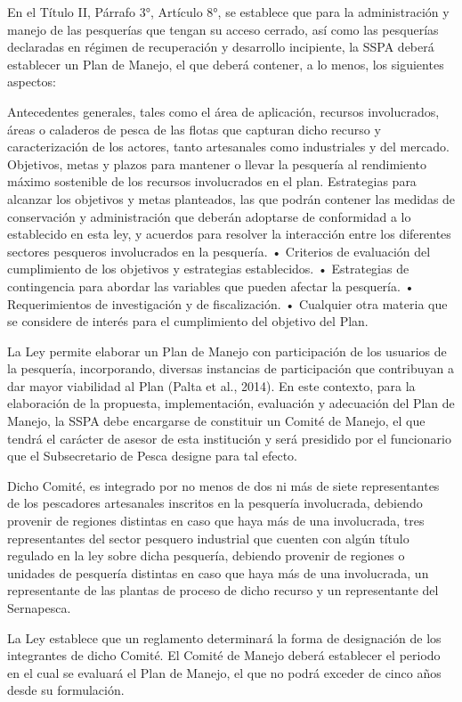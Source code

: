 \documentclass[
]{article}
\begin{document}
En el Título II, Párrafo 3°, Artículo 8°, se establece que para la
administración y manejo de las pesquerías que tengan su acceso cerrado,
así como las pesquerías declaradas en régimen de recuperación y
desarrollo incipiente, la SSPA deberá establecer un Plan de Manejo, el
que deberá contener, a lo menos, los siguientes aspectos:

Antecedentes generales, tales como el área de aplicación, recursos
involucrados, áreas o caladeros de pesca de las flotas que capturan
dicho recurso y caracterización de los actores, tanto artesanales como
industriales y del mercado. Objetivos, metas y plazos para mantener o
llevar la pesquería al rendimiento máximo sostenible de los recursos
involucrados en el plan. Estrategias para alcanzar los objetivos y metas
planteados, las que podrán contener las medidas de conservación y
administración que deberán adoptarse de conformidad a lo establecido en
esta ley, y acuerdos para resolver la interacción entre los diferentes
sectores pesqueros involucrados en la pesquería. • Criterios de
evaluación del cumplimiento de los objetivos y estrategias establecidos.
• Estrategias de contingencia para abordar las variables que pueden
afectar la pesquería. • Requerimientos de investigación y de
fiscalización. • Cualquier otra materia que se considere de interés para
el cumplimiento del objetivo del Plan.

La Ley permite elaborar un Plan de Manejo con participación de los
usuarios de la pesquería, incorporando, diversas instancias de
participación que contribuyan a dar mayor viabilidad al Plan (Palta et
al., 2014). En este contexto, para la elaboración de la propuesta,
implementación, evaluación y adecuación del Plan de Manejo, la SSPA debe
encargarse de constituir un Comité de Manejo, el que tendrá el carácter
de asesor de esta institución y será presidido por el funcionario que el
Subsecretario de Pesca designe para tal efecto.

Dicho Comité, es integrado por no menos de dos ni más de siete
representantes de los pescadores artesanales inscritos en la pesquería
involucrada, debiendo provenir de regiones distintas en caso que haya
más de una involucrada, tres representantes del sector pesquero
industrial que cuenten con algún título regulado en la ley sobre dicha
pesquería, debiendo provenir de regiones o unidades de pesquería
distintas en caso que haya más de una involucrada, un representante de
las plantas de proceso de dicho recurso y un representante del
Sernapesca.

La Ley establece que un reglamento determinará la forma de designación
de los integrantes de dicho Comité. El Comité de Manejo deberá
establecer el periodo en el cual se evaluará el Plan de Manejo, el que
no podrá exceder de cinco años desde su formulación.
\end{document}

